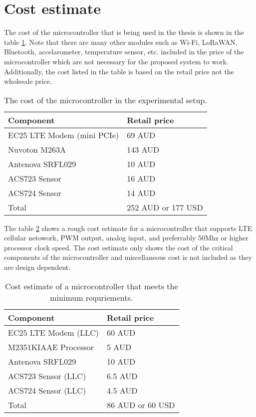 \documentclass[../thesis.tex]{subfiles}
\begin{document}
\section{Cost estimate}

The cost of the microcontroller that is being used in the thesis is shown in the table \ref{tab:mcestimateexp}. Note that there are many other modules such as Wi-Fi, LoRaWAN, Bluetooth, accelarometer, temperature sensor, etc. included in the price of the microcontroller which are not necessary for the proposed system to work. Additionally, the cost listed in the table is based on the retail price not the wholesale price. 

\begin{table}[h!]
	\begin{center}
		\caption{The cost of the microcontroller in the experimental setup.}
		\label{tab:mcestimateexp}
		\begin{tabular}{l|l}
			\toprule
			\textbf{Component} & \textbf{Retail price}\\
			\midrule
			EC25 LTE Modem (mini PCIe) & 69 AUD\\
			Nuvoton M263A & 143 AUD\\
			Antenova SRFL029 & 10 AUD\\
			ACS723 Sensor & 16 AUD\\
			ACS724 Sensor & 14 AUD\\
			\midrule
			Total & 252 AUD or 177 USD\\
			\bottomrule
		\end{tabular}
	\end{center}
\end{table}


The table \ref{tab:mcestimate} shows a rough cost estimate for a microcontroller that supports LTE cellular netowork, PWM output, analog input, and preferrably 50Mhz or higher processor clock speed. The cost estimate only shows the cost of the critical components of the microcontroller and miscellaneous cost is not included as they are design dependent.

\begin{table}[h!]
	\begin{center}
		\caption{Cost estimate of a microcontroller that meets the minimum requriements.}
		\label{tab:mcestimate}
		\begin{tabular}{l|l}
			\toprule
			\textbf{Component} & \textbf{Retail price}\\
			\midrule
			EC25 LTE Modem (LLC) & 60 AUD\\
			M2351KIAAE Processor & 5 AUD\\
			Antenova SRFL029 & 10 AUD\\
			ACS723 Sensor (LLC) & 6.5 AUD\\
			ACS724 Sensor (LLC) & 4.5 AUD\\
			\midrule
			Total & 86 AUD or 60 USD\\
			\bottomrule
		\end{tabular}
	\end{center}
\end{table}

\newpage
\end{document}
